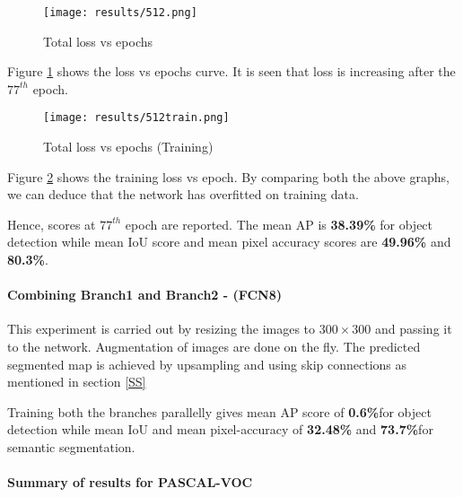 \begin{figure}[h!]
\centering
    \texttt{[image: results/512.png]}
    \caption{Total loss vs epochs}
    \label{512feature}
\end{figure}

Figure \ref{512feature} shows the loss vs epochs curve. It is seen that loss is increasing after the $77^{th}$ epoch.

\begin{figure}[h!]
\centering
    \texttt{[image: results/512train.png]}
    \caption{Total loss vs epochs (Training)}
    \label{512featuretrain}
\end{figure}

Figure \ref{512featuretrain} shows the training loss vs epoch. By comparing both the above graphs, we can deduce that the network has overfitted on training data. 
\par
Hence, scores at $77^{th}$ epoch are reported. The mean AP is \textbf{38.39\%} for object detection while mean IoU score and mean pixel accuracy scores are \textbf{49.96\%} and \textbf{80.3\%}.



\paragraph{Combining Branch1 and Branch2 - (FCN8)}

This experiment is carried out by resizing the images to $300\times300$ and passing it to the network. Augmentation of images are done on the fly. The predicted segmented map is achieved by upsampling and using skip connections as mentioned in section \ref{SS}

Training both the branches parallelly gives mean AP score of \textbf{0.6\%}for object detection while mean IoU and mean pixel-accuracy of \textbf{32.48\%} and  \textbf{73.7\%}for semantic segmentation.

\clearpage


\newpage

\paragraph{Summary of results for PASCAL-VOC}

